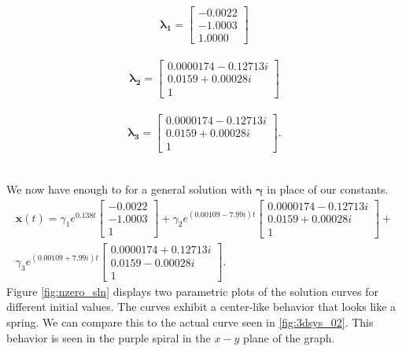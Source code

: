 \documentclass{article}
\begin{document}
\begin{minipage}{0.3\textwidth}
	\begin{gather*}
		\mathbf{\lambda_{1}}=\left[
		\begin{array}{c}
			-0.0022 \\
			-1.0003 \\
			1.0000
		\end{array}
		\right]
	\end{gather*}
\end{minipage}
\begin{minipage}{0.3\textwidth}
	\begin{gather*}
		\mathbf{\lambda_{2}}=\left[
		\begin{array}{c}
			0.0000174 - 0.12713i \\
			0.0159 + 0.00028i    \\
			1
		\end{array}
		\right]
	\end{gather*}
\end{minipage}
\begin{minipage}{0.3\textwidth}
	\begin{gather*}
		\mathbf{\lambda_{3}}=\left[
		\begin{array}{c}
			0.0000174 - 0.12713i \\
			0.0159 + 0.00028i    \\
			1
		\end{array}
		\right].
	\end{gather*}
\end{minipage}

\noindent\\
\noindent We now have enough to for a general solution with $\mathbf{\gamma}$ in place of our constants.
\begin{gather*}
	\mathbf{x}(t) =
	\gamma_{1}e^{0.138t}\left[
	\begin{array}{c}
		-0.0022 \\
		-1.0003 \\
		1
	\end{array}
	\right] +
	\gamma_{2}e^{(0.00109-7.99i)t}\left[
	\begin{array}{c}
		0.0000174 - 0.12713i \\
		0.0159 + 0.00028i    \\
		1
	\end{array}
	\right] +\\
	\gamma_{3}e^{(0.00109+7.99i)t}\left[
	\begin{array}{c}
		0.0000174 + 0.12713i \\
		0.0159 - 0.00028i    \\
		1
	\end{array}
	\right].
\end{gather*}
Figure \ref{fig:nzero_sln} displays two parametric plots of the solution curves for different initial values. The curves exhibit a center-like behavior that looks like a spring. We can compare this to the actual curve seen in \ref{fig:3dsys_02}. This behavior is seen in the purple spiral in the $x-y$ plane of the graph.
\end{document}
